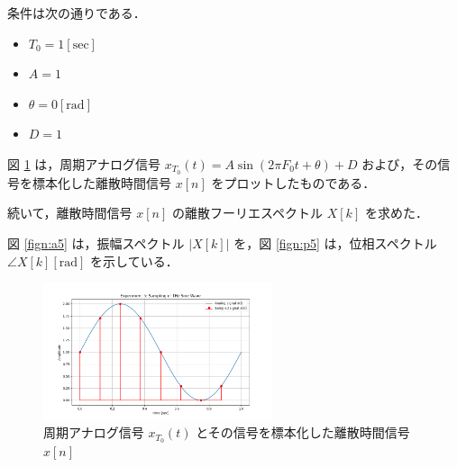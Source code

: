\documentclass[fleqn, a4paper. 12pt]{jsarticle}
\begin{document}
  条件は次の通りである．

  \begin{itemize}
    \item $T_0 = 1 [\mathrm{sec}]$
    \item $A = 1$
    \item $\theta = 0 [\mathrm{rad}]$
    \item $D = 1$
  \end{itemize}

  図 \ref{fig:s5} は，周期アナログ信号 $x_{T_0}(t)=A \sin \left(2 \pi F_0 t+\theta\right)+D$ および，その信号を標本化した離散時間信号 $x[n]$ をプロットしたものである．

  続いて，離散時間信号 $x[n]$ の離散フーリエスペクトル $X[k]$ を求めた．

  図 \ref{fign:a5} は，振幅スペクトル $|X[k]|$ を，図 \ref{fign:p5} は，位相スペクトル $\angle X[k][\mathrm{rad}]$ を示している．

  \begin{figure}[!h]
    \centering
    \includegraphics[width=0.6\textwidth]{sampling_experiment_5.png}
    \caption{周期アナログ信号 $x_{T_0}(t)$ とその信号を標本化した離散時間信号 $x[n]$}
    \label{fig:s5}
  \end{figure}
\end{document}
